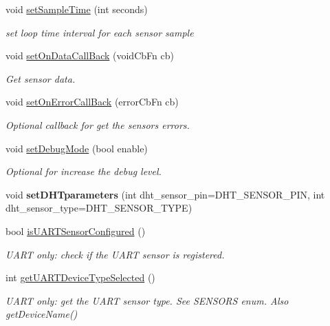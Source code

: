 \begin{DoxyCompactItemize}
void \hyperlink{classSensors_ac723c0d9cf5af5daa0fa8d041f41f3d8}{set\+Sample\+Time} (int seconds)
\begin{DoxyCompactList}\small\item\em set loop time interval for each sensor sample \end{DoxyCompactList}\item 
void \hyperlink{classSensors_a729f911e0508cc8814a2276ff519b219}{set\+On\+Data\+Call\+Back} (void\+Cb\+Fn cb)
\begin{DoxyCompactList}\small\item\em Get sensor data. \end{DoxyCompactList}\item 
void \hyperlink{classSensors_aba1b7a633d1d89514c891220b603351f}{set\+On\+Error\+Call\+Back} (error\+Cb\+Fn cb)
\begin{DoxyCompactList}\small\item\em Optional callback for get the sensors errors. \end{DoxyCompactList}\item 
void \hyperlink{classSensors_ac749e2c2618a177afa7d72ce68573fa5}{set\+Debug\+Mode} (bool enable)
\begin{DoxyCompactList}\small\item\em Optional for increase the debug level. \end{DoxyCompactList}\item 
\mbox{\label{classSensors_a01bcf5b93e803442624669101878b8f9}} 
void {\bfseries set\+D\+H\+Tparameters} (int dht\+\_\+sensor\+\_\+pin=D\+H\+T\+\_\+\+S\+E\+N\+S\+O\+R\+\_\+\+P\+IN, int dht\+\_\+sensor\+\_\+type=D\+H\+T\+\_\+\+S\+E\+N\+S\+O\+R\+\_\+\+T\+Y\+PE)
\item 
bool \hyperlink{classSensors_aa99811f9bb9778253e4d0476fab7b86c}{is\+U\+A\+R\+T\+Sensor\+Configured} ()
\begin{DoxyCompactList}\small\item\em U\+A\+RT only\+: check if the U\+A\+RT sensor is registered. \end{DoxyCompactList}\item 
int \hyperlink{classSensors_aaca8ec4ae2c64c366c33622d3332ffb1}{get\+U\+A\+R\+T\+Device\+Type\+Selected} ()
\begin{DoxyCompactList}\small\item\em U\+A\+RT only\+: get the U\+A\+RT sensor type. See S\+E\+N\+S\+O\+RS enum. Also get\+Device\+Name() \end{DoxyCompactList}\item 

\end{DoxyCompactItemize}
